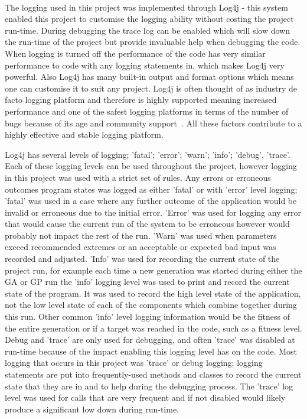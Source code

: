 \documentclass[12pt]{article}
\begin{document}
\paragraph{}

The logging used in this project was implemented through Log4j - this system enabled this project to customise the logging 
ability without costing the project run-time. During debugging the trace log can be enabled which will slow down the
run-time of the project but provide invaluable help when debugging the code. When logging is turned off the performance
of the code has very similar performance to code with any logging statements in, which makes Log4j very powerful. Also
Log4j has many built-in output and format options which means one can customise it to suit any project. Log4j is often
thought of as industry de facto logging platform and therefore is highly supported meaning increased performance
and one of the safest logging platforms in terms of the number of bugs because of its age and community support~\cite{log4j}. All these
factors contribute to a highly effective and stable logging platform. 

Log4j has several levels of logging; 'fatal'; 'error'; 'warn'; 'info'; 'debug', 'trace'. Each of these logging levels can be used throughout
the project, however logging in this project was used with a strict set of rules. Any errors or erroneous outcomes program states 
was logged as either 'fatal' or with 'error' level logging; 'fatal' was used in a case where any further outcome of the application
would be invalid or erroneous due to the initial error. 'Error' was used for logging any error that would cause the current run of the system to be
erroneous however would probably not impact the rest of the run. 'Warn' was used when parameters exceed recommended
extremes or an acceptable or expected bad input was recorded and adjusted. 'Info' was used for recording the current state of
the project run, for example each time a new generation was started during either the GA or GP run the 'info' logging level was
used to print and record the current state of the program. It was used to record the high level state of the application,
not the low level state of each of the components which combine together during this run. Other common 'info' level logging
information would be the fitness of the entire generation or if a target was reached in the code, such as a fitness level.
Debug and 'trace' are only used for debugging, and often 'trace' was disabled at run-time because of the impact enabling this
logging level has on the code. Most logging that occurs in this project was 'trace' or debug logging; logging statements are
put into frequently-used methods and classes to record the current state that they are in and to help during the debugging
process. The 'trace' log level was used for calls that are very frequent and if not disabled would likely produce a significant
low down during run-time. 
\end{document}
